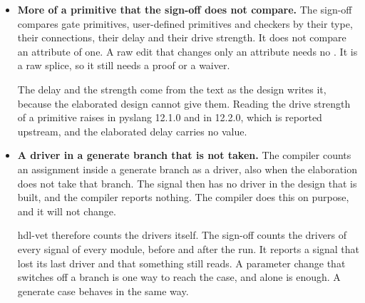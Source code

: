 \begin{itemize}
  A replacement pair that later calls on the same instance follow is cancelled without a
  look at the design. The design of the middle does not exist. A removal of a thing of the
  input design and the addition that puts it back are no pair, so both stay applied.

  A raw splice is no record. A pair stays cancelled when a raw splice afterwards writes the
  same thing again. After a resume, a record of the saved part is paired only when the module
  has one thing of that kind with a check. With two, the records stay applied.

  No operation changes a port, so declare a change of width or direction with
  . After a pair that cancels, the structural check does not see a raw edit
  that declares the name again inside a generate block. The comparison of the module still
  judges that raw edit.
\item \textbf{More of a primitive that the sign-off does not compare.} The sign-off
  compares gate primitives, user-defined primitives and checkers by their type, their
  connections, their delay and their drive strength. It does not compare an attribute of
  one. A raw edit that changes only an attribute needs no . It is a raw
  splice, so it still needs a proof or a waiver.

  The delay and the strength come from the text as the design writes it, because the
  elaborated design cannot give them. Reading the drive strength of a primitive raises in
  pyslang 12.1.0 and in 12.2.0, which is reported upstream, and the elaborated delay
  carries no value.
\item \textbf{A driver in a generate branch that is not taken.} The compiler counts an
  assignment inside a generate branch as a driver, also when the elaboration does not take
  that branch. The signal then has no driver in the design that is built, and the compiler
  reports nothing. The compiler does this on purpose, and it will not change.

  hdl-vet therefore counts the drivers itself. The sign-off counts the drivers of every
  signal of every module, before and after the run. It reports a signal that lost its last
  driver and that something still reads. A parameter change that switches off a branch is
  one way to reach the case, and  alone is enough. A generate case behaves in
  the same way.


\end{itemize}

